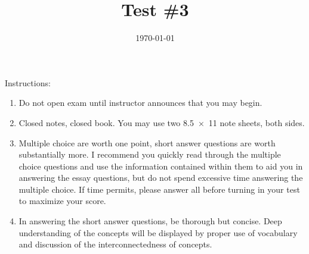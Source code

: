 \documentclass[exam,addpoints,noanswers]{exam}
\title{Test \#3}
\date{\today}
\author{\mobeardInstructorShort}
\begin{document}
\maketitle
\vfill
\mobeardExamNameBlock
\vfill
Instructions: 
\begin{enumerate}
\item Do not open exam until instructor announces that you may begin.
\item Closed notes, closed book.  You may use two \SI{8.5x11}{\inch} note sheets, both sides.
\item Multiple choice are worth one point, short answer questions are worth substantially more. I recommend you quickly read through the multiple choice questions and use the information contained within them to aid you in answering the essay questions, but do not spend excessive time answering the multiple choice. If time permits, please answer all before turning in your test to maximize your score.
\item In answering the short answer questions, be thorough but concise. Deep understanding of the concepts will be displayed by proper use of vocabulary and discussion of the interconnectedness of concepts.
\end{enumerate}
\vfill
\begin{center}
\gradetable[h][questions]
\end{center}
\clearpage
\end{document}
